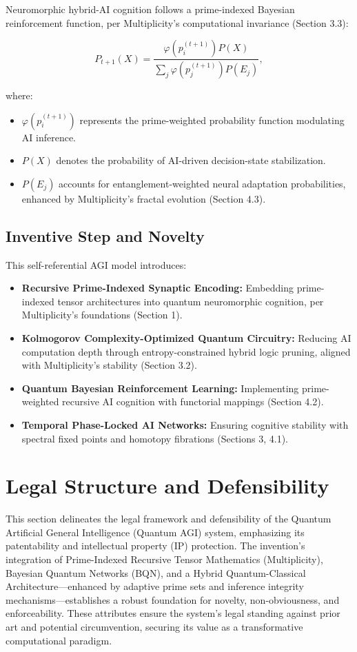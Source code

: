 \documentclass[12pt]{article}
\begin{document}
Neuromorphic hybrid-AI cognition follows a prime-indexed Bayesian reinforcement function, per Multiplicity’s computational invariance (Section 3.3):

\begin{equation}
    P_{t+1}(X) = \frac{\varphi(p_i^{(t+1)}) P(X)}{\sum_j \varphi(p_j^{(t+1)}) P(E_j)},
\end{equation}

where:
\begin{itemize}
    \item \(\varphi(p_i^{(t+1)})\) represents the prime-weighted probability function modulating AI inference.
    \item \(P(X)\) denotes the probability of AI-driven decision-state stabilization.
    \item \(P(E_j)\) accounts for entanglement-weighted neural adaptation probabilities, enhanced by Multiplicity’s fractal evolution (Section 4.3).
\end{itemize}

\subsection{Inventive Step and Novelty}

This self-referential AGI model introduces:
\begin{itemize}
    \item \textbf{Recursive Prime-Indexed Synaptic Encoding:} Embedding prime-indexed tensor architectures into quantum neuromorphic cognition, per Multiplicity’s foundations (Section 1).
    \item \textbf{Kolmogorov Complexity-Optimized Quantum Circuitry:} Reducing AI computation depth through entropy-constrained hybrid logic pruning, aligned with Multiplicity’s stability (Section 3.2).
    \item \textbf{Quantum Bayesian Reinforcement Learning:} Implementing prime-weighted recursive AI cognition with functorial mappings (Section 4.2).
    \item \textbf{Temporal Phase-Locked AI Networks:} Ensuring cognitive stability with spectral fixed points and homotopy fibrations (Sections 3, 4.1).
\end{itemize}
\section{Legal Structure and Defensibility}

This section delineates the legal framework and defensibility of the Quantum Artificial General Intelligence (Quantum AGI) system, emphasizing its patentability and intellectual property (IP) protection. The invention’s integration of Prime-Indexed Recursive Tensor Mathematics (Multiplicity), Bayesian Quantum Networks (BQN), and a Hybrid Quantum-Classical Architecture—enhanced by adaptive prime sets and inference integrity mechanisms—establishes a robust foundation for novelty, non-obviousness, and enforceability. These attributes ensure the system’s legal standing against prior art and potential circumvention, securing its value as a transformative computational paradigm.
\end{document}

